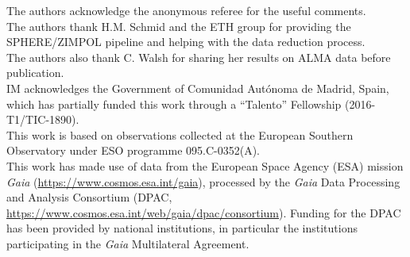 \documentclass{aa}
\begin{document}
\begin{acknowledgements}
The authors acknowledge the anonymous referee for the useful comments.\\      
The authors thank H.M. Schmid and the ETH group for providing the SPHERE/ZIMPOL pipeline and helping with the data reduction process.\\
The authors also thank C. Walsh for sharing her results on ALMA data before publication.\\ 
IM acknowledges the Government of Comunidad Aut\'onoma de Madrid, Spain, which has partially funded this work through a ``Talento'' Fellowship (2016-T1/TIC-1890).\\
This work is based on observations collected at the European Southern Observatory under ESO programme 095.C-0352(A).\\
This work has made use of data from the European Space Agency (ESA)
mission {\it Gaia} (\url{https://www.cosmos.esa.int/gaia}), processed by
the {\it Gaia} Data Processing and Analysis Consortium (DPAC,
\url{https://www.cosmos.esa.int/web/gaia/dpac/consortium}). Funding
for the DPAC has been provided by national institutions, in particular
the institutions participating in the {\it Gaia} Multilateral Agreement.\\

\end{acknowledgements}
\end{document}
